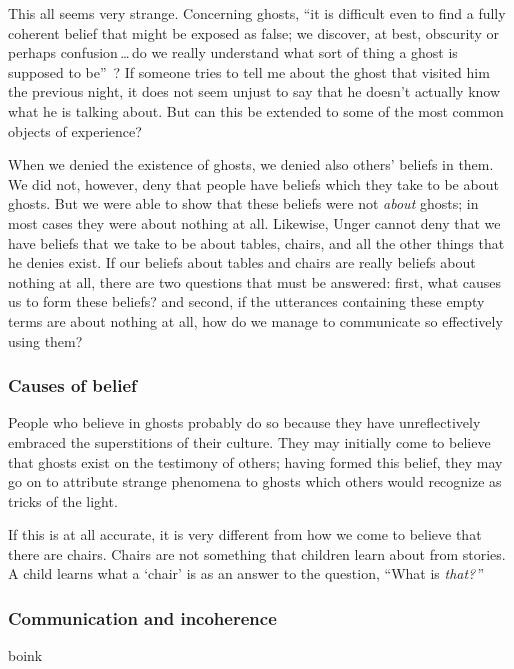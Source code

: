 \documentclass[11pt]{article}
\begin{document}
\begin{spacing}{1.5}
This all seems very strange. Concerning ghosts, ``it is difficult even to find a fully coherent belief that might be exposed as false; we discover, at best, obscurity or perhaps confusion\,\ldots\,do we really understand what sort of thing a ghost is supposed to be''~\citep[76]{stroud2000a}? If someone tries to tell me about the ghost that visited him the previous night, it does not seem unjust to say that he doesn't actually know what he is talking about. But can this be extended to some of the most common objects of experience?

When we denied the existence of ghosts, we denied also others' beliefs in them. We did not, however, deny that people have beliefs which they take to be about ghosts. But we were able to show that these beliefs were not {\em about} ghosts; in most cases they were about nothing at all. Likewise, Unger cannot deny that we have beliefs that we take to be about tables, chairs, and all the other things that he denies exist. If our beliefs about tables and chairs are really beliefs about nothing at all, there are two questions that must be answered: first, what causes us to form these beliefs? and second, if the utterances containing these empty terms are about nothing at all, how do we manage to communicate so effectively using them?

\subsubsection{Causes of belief}
\label{unger-cause}
People who believe in ghosts probably do so because they have unreflectively embraced the superstitions of their culture. They may initially come to believe that ghosts exist on the testimony of others; having formed this belief, they may go on to attribute strange phenomena to ghosts which others would recognize as tricks of the light.

If this is at all accurate, it is very different from how we come to believe that there are chairs. Chairs are not something that children learn about from stories. A child learns what a `chair' is as an answer to the question, ``What is {\em that?}\,''

\subsubsection{Communication and incoherence}
\label{unger-comm}
boink

\ifstandalone
\end{spacing}


\fi
\end{document}
